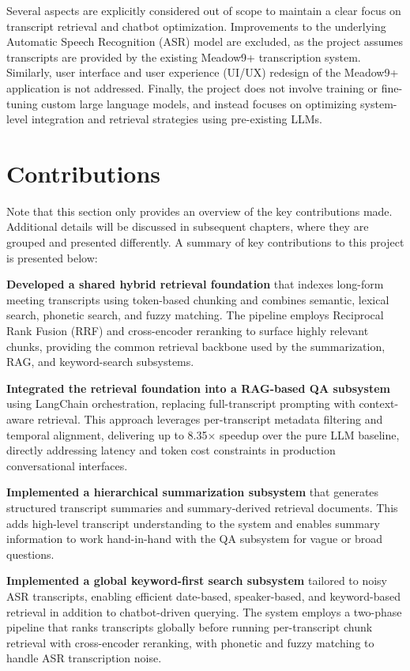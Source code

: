 Several aspects are explicitly considered out of scope to maintain a clear focus on transcript retrieval and chatbot optimization. Improvements to the underlying Automatic Speech Recognition (ASR) model are excluded, as the project assumes transcripts are provided by the existing Meadow9+ transcription system. Similarly, user interface and user experience (UI/UX) redesign of the Meadow9+ application is not addressed. Finally, the project does not involve training or fine-tuning custom large language models, and instead focuses on optimizing system-level integration and retrieval strategies using pre-existing LLMs.

\section{Contributions}
Note that this section only provides an overview of the key contributions made. Additional details will be discussed in subsequent chapters, where they are grouped and presented differently. A summary of key contributions to this project is presented below:

\textbf{Developed a shared hybrid retrieval foundation} that indexes long-form meeting transcripts using token-based chunking and combines semantic, lexical search, phonetic search, and fuzzy matching. The pipeline employs Reciprocal Rank Fusion (RRF) \cite{cormack2009reciprocal} and cross-encoder reranking \cite{nogueira2019passage} to surface highly relevant chunks, providing the common retrieval backbone used by the summarization, RAG, and keyword-search subsystems.

\textbf{Integrated the retrieval foundation into a RAG-based QA subsystem} using LangChain orchestration, replacing full-transcript prompting with context-aware retrieval. This approach leverages per-transcript metadata filtering and temporal alignment, delivering up to 8.35$\times$ speedup over the pure LLM baseline, directly addressing latency and token cost constraints in production conversational interfaces.

\textbf{Implemented a hierarchical summarization subsystem} that generates structured transcript summaries and summary-derived retrieval documents. This adds high-level transcript understanding to the system and enables summary information to work hand-in-hand with the QA subsystem for vague or broad questions.

\textbf{Implemented a global keyword-first search subsystem} tailored to noisy ASR transcripts, enabling efficient date-based, speaker-based, and keyword-based retrieval in addition to chatbot-driven querying. The system employs a two-phase pipeline that ranks transcripts globally before running per-transcript chunk retrieval with cross-encoder reranking, with phonetic and fuzzy matching to handle ASR transcription noise.

